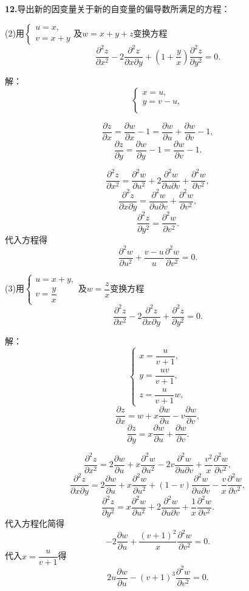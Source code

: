 \documentclass[12pt, a4paper]{article}
\begin{document}
\textbf{12.}导出新的因变量关于新的自变量的偏导数所满足的方程：

(2)用\(\begin{cases}
u = x, \\
v = x + y
\end{cases}\)及\(w = x + y + z\)变换方程
\[\frac{\partial^2 z}{\partial x^2} - 2\frac{\partial^2 z}{\partial x \partial y} + \left(1 + \frac{y}{x}\right)\frac{\partial^2 z}{\partial y^2} = 0.\]

解：
\[\begin{cases}
x = u, \\
y = v - u, \\
\end{cases}\]

\[\frac{\partial z}{\partial x} = \frac{\partial w}{\partial x} - 1 = \frac{\partial w}{\partial u} + \frac{\partial w}{\partial v} - 1,\]
\[\frac{\partial z}{\partial y} = \frac{\partial w}{\partial y} - 1 = \frac{\partial w}{\partial v} - 1.\]

\[\frac{\partial^2 z}{\partial x^2} = \frac{\partial^2 w}{\partial u^2} + 2 \frac{\partial^2 w}{\partial u \partial v} + \frac{\partial^2 w}{\partial v^2},\]
\[\frac{\partial^2 z}{\partial x \partial y} = \frac{\partial^2 w}{\partial u \partial v} + \frac{\partial^2 w}{\partial v^2},\]
\[\frac{\partial^2 z}{\partial y^2} = \frac{\partial^2 w}{\partial v^2}.\]
代入方程得
\[\frac{\partial^2 w}{\partial u^2} + \frac{v - u}{u} \frac{\partial^2 w}{\partial v^2} = 0.\]

(3)用\(\begin{cases}
u = x + y, \\
v = \dfrac{y}{x}
\end{cases}\)及\(w = \dfrac{z}{x}\)变换方程
\[\frac{\partial^2 z}{\partial x^2} - 2\frac{\partial^2 z}{\partial x \partial y} + \frac{\partial^2 z}{\partial y^2} = 0.\]

解：
\[\begin{cases}
x = \dfrac{u}{v + 1}, \\
y = \dfrac{uv}{v + 1}, \\
z = \dfrac{u}{v + 1} w,
\end{cases}\]
\[\frac{\partial z}{\partial x} = w + x \frac{\partial w}{\partial u} - v \frac{\partial w}{\partial v},\]
\[\frac{\partial z}{\partial y} = x \frac{\partial w}{\partial u} + \frac{\partial w}{\partial v}.\]

\[\frac{\partial^2 z}{\partial x^2} = 2 \frac{\partial w}{\partial u} + x \frac{\partial^2 w}{\partial u^2} - 2v \frac{\partial^2 w}{\partial u \partial v} + \frac{v^2}{x} \frac{\partial^2 w}{\partial v^2},\]
\[\frac{\partial^2 z}{\partial x \partial y} = 2 \frac{\partial w}{\partial u} + x \frac{\partial^2 w}{\partial u^2} + (1 - v) \frac{\partial^2 w}{\partial u \partial v} - \frac{v}{x} \frac{\partial^2 w}{\partial v^2},\]
\[\frac{\partial^2 z}{\partial y^2} = x \frac{\partial^2 w}{\partial u^2} + 2 \frac{\partial^2 w}{\partial u \partial v} + \frac{1}{x} \frac{\partial^2 w}{\partial v^2}.\]
代入方程化简得
\[-2\frac{\partial w}{\partial u} + \frac{(v + 1)^2}{x} \frac{\partial^2 w}{\partial v^2} = 0.\]
代入\(x = \dfrac{u}{v + 1}\)得
\[2u\frac{\partial w}{\partial u} - (v + 1)^3 \frac{\partial^2 w}{\partial v^2} = 0.\]
\end{document}
